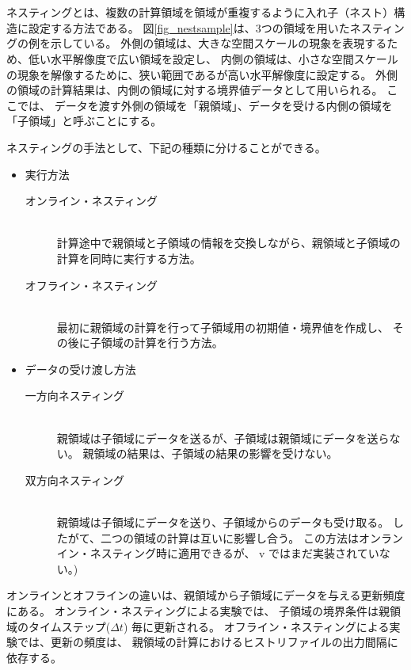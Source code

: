 \section{\SecAdvanceNesting} \label{sec:nest_exp}

ネスティングとは、複数の計算領域を領域が重複するように入れ子（ネスト）構造に設定する方法である。
図\ref{fig_nestsample}は、3つの領域を用いたネスティングの例を示している。
外側の領域は、大きな空間スケールの現象を表現するため、低い水平解像度で広い領域を設定し、
内側の領域は、小さな空間スケールの現象を解像するために、狭い範囲であるが高い水平解像度に設定する。
外側の領域の計算結果は、内側の領域に対する境界値データとして用いられる。
ここでは、
データを渡す外側の領域を「親領域」、データを受ける内側の領域を「子領域」と呼ぶことにする。

ネスティングの手法として、下記の種類に分けることができる。
\begin{itemize}
\item 実行方法
\begin{description}
 \item[オンライン・ネスティング]\mbox{}\\
計算途中で親領域と子領域の情報を交換しながら、親領域と子領域の計算を同時に実行する方法。
 \item[オフライン・ネスティング]\mbox{}\\
最初に親領域の計算を行って子領域用の初期値・境界値を作成し、
その後に子領域の計算を行う方法。
\end{description}
\item データの受け渡し方法
\begin{description}
 \item[一方向ネスティング]\mbox{}\\
親領域は子領域にデータを送るが、子領域は親領域にデータを送らない。
親領域の結果は、子領域の結果の影響を受けない。
 \item[双方向ネスティング]\mbox{}\\
親領域は子領域にデータを送り、子領域からのデータも受け取る。
したがて、二つの領域の計算は互いに影響し合う。
この方法はオンランイン・ネスティング時に適用できるが、
{\scalerm} v{\version} ではまだ実装されていない。)
\end{description}
\end{itemize}

オンラインとオフラインの違いは、親領域から子領域にデータを与える更新頻度にある。
オンライン・ネスティングによる実験では、
子領域の境界条件は親領域のタイムステップ($\Delta t$) 毎に更新される。
オフライン・ネスティングによる実験では、更新の頻度は、
親領域の計算におけるヒストリファイルの出力間隔に依存する。

